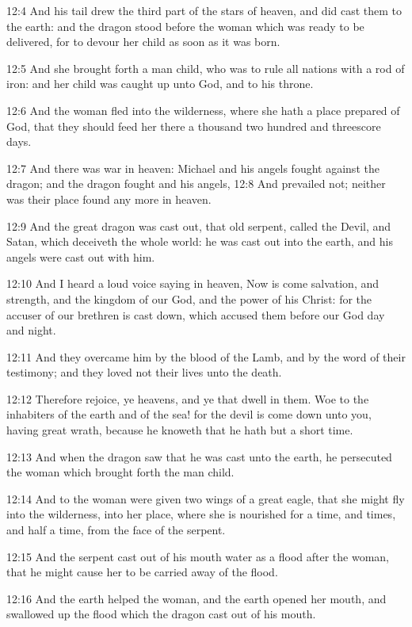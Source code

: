 12:4 And his tail drew the third part of the stars of heaven, and did cast them to the earth: and the dragon stood before the woman which was ready to be delivered, for to devour her child as soon as it was born.

12:5 And she brought forth a man child, who was to rule all nations with a rod of iron: and her child was caught up unto God, and to his throne.

12:6 And the woman fled into the wilderness, where she hath a place prepared of God, that they should feed her there a thousand two hundred and threescore days.

12:7 And there was war in heaven: Michael and his angels fought against the dragon; and the dragon fought and his angels, 12:8 And prevailed not; neither was their place found any more in heaven.

12:9 And the great dragon was cast out, that old serpent, called the Devil, and Satan, which deceiveth the whole world: he was cast out into the earth, and his angels were cast out with him.

12:10 And I heard a loud voice saying in heaven, Now is come salvation, and strength, and the kingdom of our God, and the power of his Christ: for the accuser of our brethren is cast down, which accused them before our God day and night.

12:11 And they overcame him by the blood of the Lamb, and by the word of their testimony; and they loved not their lives unto the death.

12:12 Therefore rejoice, ye heavens, and ye that dwell in them. Woe to the inhabiters of the earth and of the sea! for the devil is come down unto you, having great wrath, because he knoweth that he hath but a short time.

12:13 And when the dragon saw that he was cast unto the earth, he persecuted the woman which brought forth the man child.

12:14 And to the woman were given two wings of a great eagle, that she might fly into the wilderness, into her place, where she is nourished for a time, and times, and half a time, from the face of the serpent.

12:15 And the serpent cast out of his mouth water as a flood after the woman, that he might cause her to be carried away of the flood.

12:16 And the earth helped the woman, and the earth opened her mouth, and swallowed up the flood which the dragon cast out of his mouth.

